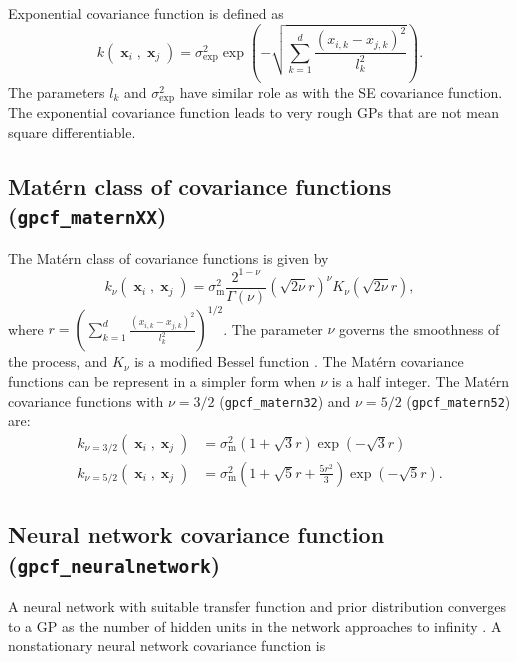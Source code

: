 \documentclass[twoside,11pt]{article}
\DeclareMathOperator{\x}{\mathbf{x}}
\newcommand{\code}[1]{{\normalfont\texttt{#1}}}
\begin{document}
Exponential covariance function is defined as
\begin{equation}
%
k(\x_i,\x_j)=\sigma_{\textrm{exp}}^2\exp\left(-\sqrt{\sum_{k=1}^d
  \frac{(x_{i,k}-x_{j,k})^2}{l_k^2}} \right).
%
\end{equation}
The parameters $l_k$ and $\sigma_{\textrm{exp}}^2$ have similar
role as with the SE covariance function. The exponential covariance
function leads to very rough GPs that are not mean square
differentiable.

\subsection*{Mat\'ern class of covariance functions (\code{gpcf\_maternXX})}

The Mat\'ern class of covariance functions is given by
\begin{equation}\label{matern}
  k_{\nu}(\x_i,\x_j)=\sigma_{\textrm{m}}^2
  \frac{2^{1-\nu}}{\Gamma(\nu)}\left(\sqrt{2\nu}r\right)^{\nu}
  K_{\nu}\left(\sqrt{2\nu}r\right),
\end{equation}
where $r = \left(\sum_{k=1}^d
  \frac{(x_{i,k}-x_{j,k})^2}{l_k^2}\right)^{1/2}$. The parameter $\nu$
governs the smoothness of the process, and $K_{\nu}$ is a modified
Bessel function \citep[sec.  9.6]{Abramowitz+Stegun:1970}. 
%
The Mat\'ern covariance functions can be represent in a simpler form
when $\nu$ is a half integer. The Mat\'ern covariance
functions with $\nu=3/2$ (\code{gpcf\_matern32}) and $\nu=5/2$ (\code{gpcf\_matern52}) are:
\begin{align}\label{matern3/2_ARD}
k_{\nu=3/2}(\x_i,\x_j)& =\sigma_{\mathrm{m}}^2\left(1+\sqrt{3}r\right)
\exp\left(-\sqrt{3}r\right) \\
k_{\nu=5/2}(\x_i,\x_j) & =\sigma_{\textrm{m}}^2\left(1+\sqrt{5}r
  + \frac{5r^2}{3}\right)\exp\left(-\sqrt{5}r\right).\label{matern5/2_ARD}
\end{align}

\subsection*{Neural network covariance function (\code{gpcf\_neuralnetwork})}

A neural network with suitable transfer function and prior
distribution converges to a GP as the number of hidden units in the
network approaches to infinity
\citep{Neal:1996a,Williams:1996,Williams:1998,Rasmussen+Williams:2006}. A
nonstationary neural network covariance function is 
\end{document}
